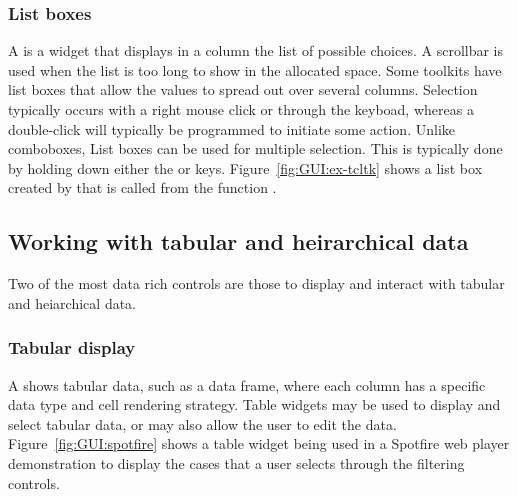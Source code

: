 \subsubsection{List boxes}

A  is a widget that displays in a column the list of
possible choices. A scrollbar is used when the list is too long to
show in the allocated space. Some toolkits have list boxes that allow
the values to spread out over several columns. Selection typically
occurs with a right mouse click or through the keyboad, whereas a
double-click will typically be programmed to initiate some
action. Unlike comboboxes, List boxes can be used for multiple
selection. This is typically done by holding down either the
 or  keys. Figure~\ref{fig:GUI:ex-tcltk} shows a
list box created by \R\/ that is called from the function
.






\subsection{Working with tabular and heirarchical data}
\label{sec:GUI:tabular-display}

Two of the most data rich controls are those to display and
interact with tabular and heiarchical data.


\subsubsection{Tabular display}

A  shows tabular data, such as a data frame, where
each column has a specific data type and cell rendering strategy.
Table widgets may be used to display and select tabular data, or may
also allow the user to edit the
data.  Figure~\ref{fig:GUI:spotfire} shows a table widget being used
in a Spotfire web player demonstration to
display the cases that a user selects through the filtering controls.


